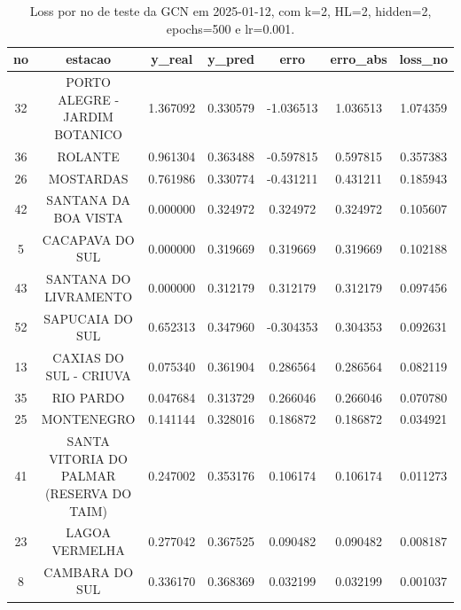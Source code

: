 \begin{table}[h]
\centering
\caption{Loss por no de teste da GCN em 2025-01-12, com k=2, HL=2, hidden=2, epochs=500 e lr=0.001.}
\label{tab:gcn_loss_k2_hl2_h2_e500_d20250112}
\begin{tabular}{ccccccc}
\toprule
no & estacao & y\_real & y\_pred & erro & erro\_abs & loss\_no \\
\midrule
32 & PORTO ALEGRE - JARDIM BOTANICO & 1.367092 & 0.330579 & -1.036513 & 1.036513 & 1.074359 \\
36 & ROLANTE & 0.961304 & 0.363488 & -0.597815 & 0.597815 & 0.357383 \\
26 & MOSTARDAS & 0.761986 & 0.330774 & -0.431211 & 0.431211 & 0.185943 \\
42 & SANTANA DA BOA VISTA & 0.000000 & 0.324972 & 0.324972 & 0.324972 & 0.105607 \\
5 & CACAPAVA DO SUL & 0.000000 & 0.319669 & 0.319669 & 0.319669 & 0.102188 \\
43 & SANTANA DO LIVRAMENTO & 0.000000 & 0.312179 & 0.312179 & 0.312179 & 0.097456 \\
52 & SAPUCAIA DO SUL & 0.652313 & 0.347960 & -0.304353 & 0.304353 & 0.092631 \\
13 & CAXIAS DO SUL - CRIUVA & 0.075340 & 0.361904 & 0.286564 & 0.286564 & 0.082119 \\
35 & RIO PARDO & 0.047684 & 0.313729 & 0.266046 & 0.266046 & 0.070780 \\
25 & MONTENEGRO & 0.141144 & 0.328016 & 0.186872 & 0.186872 & 0.034921 \\
41 & SANTA VITORIA DO PALMAR (RESERVA DO TAIM) & 0.247002 & 0.353176 & 0.106174 & 0.106174 & 0.011273 \\
23 & LAGOA VERMELHA & 0.277042 & 0.367525 & 0.090482 & 0.090482 & 0.008187 \\
8 & CAMBARA DO SUL & 0.336170 & 0.368369 & 0.032199 & 0.032199 & 0.001037 \\
\bottomrule
\end{tabular}
\end{table}
